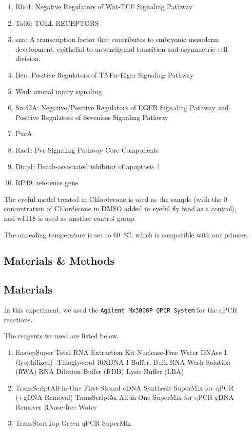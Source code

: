 \begin{enumerate}
    \item Rho1: Negative Regulators of Wnt-TCF Signaling Pathway
    \item Toll6: TOLL RECEPTORS
    \item sna: A transcription factor that contributes to embryonic mesoderm development, epithelial to mesenchymal transition and asymmetric cell division.
    \item Ben: Positive Regulators of TNF$\alpha$-Eiger Signaling Pathway
    \item Wnd: axonal injury signaling
    \item Src42A: Negative/Positive Regulators of EGFR Signaling Pathway and Positive Regulators of Sevenless Signaling Pathway
    \item PucA
    \item Rac1: Pvr Signaling Pathway Core Components
    \item Diap1: Death-associated inhibitor of apoptosis 1
    \item RP49: reference gene
\end{enumerate}

The eyeful model treated in Chlordecone is used as the sample (with the 0 concentration of Chlordecone in DMSO added to eyeful fly food as a control), and w1118 is used as another control group.
		
The annealing temperature is set to \SI{60}{\celsius}, which is compatible with our primers.

\subsection{Materials \& Methods}
    \subsection{Materials}
			In this experiment, we used the \texttt{Agilent Mx3000P QPCR System} for the qPCR reactions.
			
			The reagents we used are listed below.
			
			\begin{enumerate}
				\item Eastep\textregistered Super Total RNA Extraction Kit
					\subitem Nuclease-Free Water
					\subitem DNAse I (lyophilized)
					-Thioglycerol
					\subitem 10XDNA I Buffer, Bulk
					\subitem RNA Wash Solution (RWA)
					\subitem RNA Dilution Buffer (RDB)
					\subitem Lysis Buffer (LBA)
				\item TransScript\textregistered All-in-One First-Strand cDNA Synthesis SuperMix for qPCR (+gDNA Removal)
					\subitem TransScript\textregistered 5x All-in-One SuperMix for qPCR
					\subitem gDNA Remover
					\subitem RNase-free Water 
				\item TransStart\textregistered Top Green qPCR SuperMix
			\end{enumerate}
